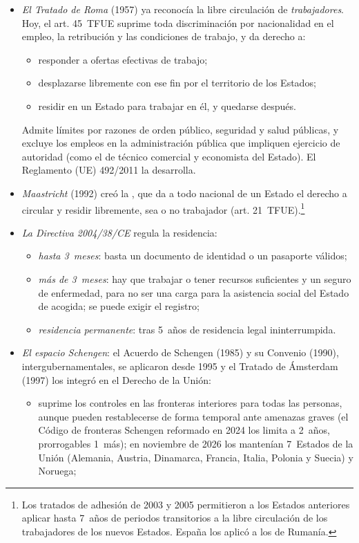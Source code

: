 \documentclass[11pt]{article}
\begin{document}
\begin{itemize}
\item \emph{El Tratado de Roma} (1957) ya reconocía la libre circulación de \emph{trabajadores}. Hoy, el art. 45~TFUE suprime toda discriminación por nacionalidad en el empleo, la retribución y las condiciones de trabajo, y da derecho a:
  \begin{itemize}
  \item responder a ofertas efectivas de trabajo;
  \item desplazarse libremente con ese fin por el territorio de los Estados;
  \item residir en un Estado para trabajar en él, y quedarse después.
  \end{itemize}
  Admite límites por razones de orden público, seguridad y salud públicas, y excluye los empleos en la administración pública que impliquen ejercicio de autoridad (como el de técnico comercial y economista del Estado). El Reglamento (UE) 492/2011 la desarrolla.
\item \emph{Maastricht} (1992) creó la , que da a todo nacional de un Estado el derecho a circular y residir libremente, sea o no trabajador (art. 21~TFUE).\footnote{Los tratados de adhesión de 2003 y 2005 permitieron a los Estados anteriores aplicar hasta 7~años de periodos transitorios a la libre circulación de los trabajadores de los nuevos Estados. España los aplicó a los de Rumanía.}
\item \emph{La Directiva 2004/38/CE} regula la residencia:
  \begin{itemize}
  \item \emph{hasta 3~meses}: basta un documento de identidad o un pasaporte válidos;
  \item \emph{más de 3~meses}: hay que trabajar o tener recursos suficientes y un seguro de enfermedad, para no ser una carga para la asistencia social del Estado de acogida; se puede exigir el registro;
  \item \emph{residencia permanente}: tras 5~años de residencia legal ininterrumpida.
  \end{itemize}
\item \emph{El espacio Schengen}: el Acuerdo de Schengen (1985) y su Convenio (1990), intergubernamentales, se aplicaron desde 1995 y el Tratado de Ámsterdam (1997) los integró en el Derecho de la Unión\nocite{CE2026Schengen}:
  \begin{itemize}
  \item suprime los controles en las fronteras interiores para todas las personas, aunque pueden restablecerse de forma temporal ante amenazas graves (el Código de fronteras Schengen reformado en 2024 los limita a 2~años, prorrogables 1~más); en noviembre de 2026 los mantenían 7~Estados de la Unión (Alemania, Austria, Dinamarca, Francia, Italia, Polonia y Suecia) y Noruega;

\end{itemize}
\end{itemize}
\end{document}
